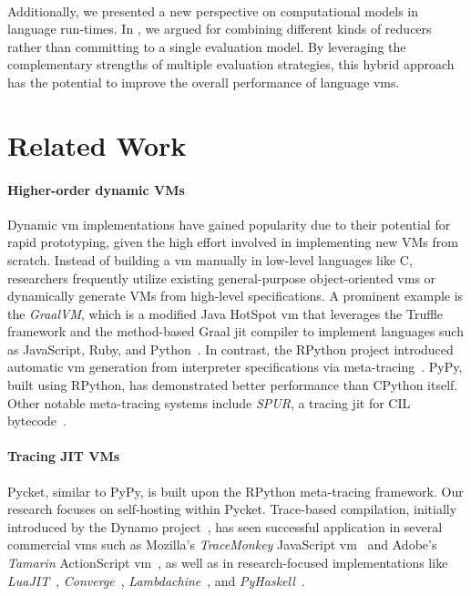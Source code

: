     \paragraph{}%
        Additionally, we presented a new perspective on computational models in language run-times. In , we argued for combining different kinds of reducers rather than committing to a single evaluation model. By leveraging the complementary strengths of multiple evaluation strategies, this hybrid approach has the potential to improve the overall performance of language \glspl{vm}.

    \section{Related Work}
        \label{section:related-work}

        \paragraph{Higher-order dynamic VMs}%
            Dynamic \gls{vm} implementations have gained popularity due to their potential for rapid prototyping, given the high effort involved in implementing new VMs from scratch. Instead of building a \gls{vm} manually in low-level languages like C, researchers frequently utilize existing general-purpose object-oriented \glspl{vm} or dynamically generate VMs from high-level specifications. A prominent example is the \emph{GraalVM}, which is a modified Java HotSpot \gls{vm} that leverages the Truffle framework and the method-based Graal \gls{jit} compiler to implement languages such as JavaScript, Ruby, and Python~\cite{truffle-graal}. In contrast, the RPython project introduced automatic \gls{vm} generation from interpreter specifications via meta-tracing~\cite{rpython07}. PyPy, built using RPython, has demonstrated better performance than CPython itself. Other notable meta-tracing systems include \emph{SPUR}, a tracing \gls{jit} for CIL bytecode~\cite{spurJIT,millerCommonLanguageInfrastructure2003}.

        \paragraph{Tracing JIT VMs}%
            Pycket, similar to PyPy, is built upon the RPython meta-tracing framework. Our research focuses on self-hosting within Pycket. Trace-based compilation, initially introduced by the Dynamo project~\cite{dynamo}, has seen successful application in several commercial \glspl{vm} such as Mozilla's \emph{TraceMonkey} JavaScript \gls{vm}~\cite{traceMonkey} and Adobe's \emph{Tamarin} ActionScript \gls{vm}~\cite{tamarin}, as well as in research-focused implementations like \emph{LuaJIT}~\cite{LuaJITLanguageToolkit}, \emph{Converge}~\cite{converge:05}, \emph{Lambdachine}~\cite{lambdamachine}, and \emph{PyHaskell}~\cite{pyhaskell}.

